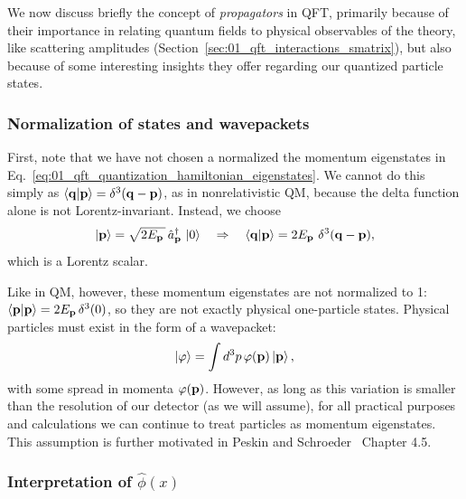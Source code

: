 We now discuss briefly the concept of \textit{propagators} in QFT, primarily because of their importance in relating quantum fields to physical observables of the theory, like scattering amplitudes (Section~\ref{sec:01_qft_interactions_smatrix}), but also because of some interesting insights they offer regarding our quantized particle states.

\subsubsection{Normalization of states and wavepackets}

First, note that we have not chosen a normalized the momentum eigenstates in Eq.~\ref{eq:01_qft_quantization_hamiltonian_eigenstates}.
We cannot do this simply as $\braket{\mathbf{q}|\mathbf{p}} = \delta^3(\mathbf{q} - \mathbf{p})$, as in nonrelativistic QM, because the delta function alone is not Lorentz-invariant.
Instead, we choose
\begin{equation}
	\label{eq:01_qft_quantization_normalization}
	\ket{\mathbf{p}} = \sqrt{2E_{\mathbf{p}}\,}\, \hat a^\dagger_{\mathbf{p}}\, \ket{0} \quad \Rightarrow \quad \braket{\mathbf{q}|\mathbf{p}} = 2E_{\mathbf{p}}\,\, \delta^3(\mathbf{q} - \mathbf{p}),
\end{equation}
which is a Lorentz scalar.

Like in QM, however, these momentum eigenstates are not normalized to 1: $\braket{\mathbf{p}|\mathbf{p}} = 2E_{\mathbf{p}}\,\delta^3(0)$, so they are not exactly physical one-particle states.
Physical particles must exist in the form of a wavepacket:
\begin{equation}
	\label{eq:01_qft_quantization_wavepacket}
	\ket{\varphi} = \int d^3p\, \varphi(\mathbf{p})\ket{\mathbf{p}},
\end{equation}
with some spread in momenta $\varphi(\mathbf{p})$.
However, as long as this variation is smaller than the resolution of our detector (as we will assume), for all practical purposes and calculations we can continue to treat particles as momentum eigenstates.
This assumption is further motivated in Peskin and Schroeder~\cite{Peskin:1995ev} Chapter 4.5.

\subsubsection{Interpretation of $\hat \phi(x)$} 

